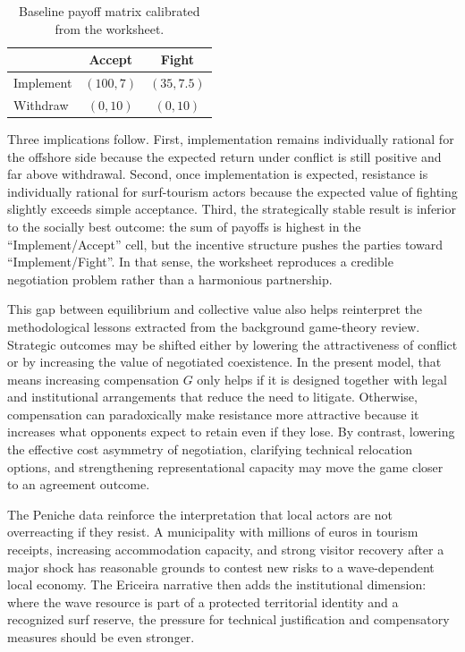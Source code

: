 \documentclass[final,times,authoryear]{elsarticle}
\begin{document}
\begin{table}[H]
\centering
\caption{Baseline payoff matrix calibrated from the worksheet.}
\label{tab:baseline_payoff}
\begin{tabular}{lcc}
\toprule
 & Accept & Fight \\
\midrule
Implement & $(100, 7)$ & $(35, 7.5)$ \\
Withdraw & $(0, 10)$ & $(0, 10)$ \\
\bottomrule
\end{tabular}
\end{table}

Three implications follow. First, implementation remains individually rational for the offshore side because the expected return under conflict is still positive and far above withdrawal. Second, once implementation is expected, resistance is individually rational for surf-tourism actors because the expected value of fighting slightly exceeds simple acceptance. Third, the strategically stable result is inferior to the socially best outcome: the sum of payoffs is highest in the ``Implement/Accept'' cell, but the incentive structure pushes the parties toward ``Implement/Fight''. In that sense, the worksheet reproduces a credible negotiation problem rather than a harmonious partnership.

This gap between equilibrium and collective value also helps reinterpret the methodological lessons extracted from the background game-theory review. Strategic outcomes may be shifted either by lowering the attractiveness of conflict or by increasing the value of negotiated coexistence. In the present model, that means increasing compensation $G$ only helps if it is designed together with legal and institutional arrangements that reduce the need to litigate. Otherwise, compensation can paradoxically make resistance more attractive because it increases what opponents expect to retain even if they lose. By contrast, lowering the effective cost asymmetry of negotiation, clarifying technical relocation options, and strengthening representational capacity may move the game closer to an agreement outcome.

The Peniche data reinforce the interpretation that local actors are not overreacting if they resist. A municipality with millions of euros in tourism receipts, increasing accommodation capacity, and strong visitor recovery after a major shock has reasonable grounds to contest new risks to a wave-dependent local economy. The Ericeira narrative then adds the institutional dimension: where the wave resource is part of a protected territorial identity and a recognized surf reserve, the pressure for technical justification and compensatory measures should be even stronger.
\end{document}
